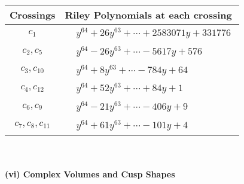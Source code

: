 \documentclass[1p]{elsarticle_modified}
\theoremstyle{definition}
\begin{document}
\begin{tabular}{m{50pt}|m{274pt}}
Crossings & \hspace{64pt}Riley Polynomials at each crossing \\
\hline $$\begin{aligned}c_{1}\end{aligned}$$&$\begin{aligned}
&y^{64}+26 y^{63}+\cdots+2583071 y+331776
\end{aligned}$\\
\hline $$\begin{aligned}c_{2},c_{5}\end{aligned}$$&$\begin{aligned}
&y^{64}-26 y^{63}+\cdots-5617 y+576
\end{aligned}$\\
\hline $$\begin{aligned}c_{3},c_{10}\end{aligned}$$&$\begin{aligned}
&y^{64}+8 y^{63}+\cdots-784 y+64
\end{aligned}$\\
\hline $$\begin{aligned}c_{4},c_{12}\end{aligned}$$&$\begin{aligned}
&y^{64}+52 y^{63}+\cdots+84 y+1
\end{aligned}$\\
\hline $$\begin{aligned}c_{6},c_{9}\end{aligned}$$&$\begin{aligned}
&y^{64}-21 y^{63}+\cdots-406 y+9
\end{aligned}$\\
\hline $$\begin{aligned}c_{7},c_{8},c_{11}\end{aligned}$$&$\begin{aligned}
&y^{64}+61 y^{63}+\cdots-101 y+4
\end{aligned}$\\
\hline
\end{tabular}\\~\\
\newpage\flushleft \textbf{(vi) Complex Volumes and Cusp Shapes}
\end{document}
